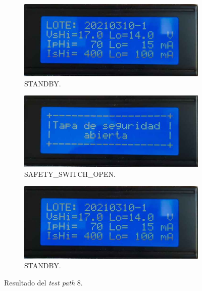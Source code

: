 \begin{figure}[!htpb]
     \centering
     \begin{subfigure}[b]{0.4\textwidth}
         \centering
         \includegraphics[width=1.1\textwidth]{./Figures/pru_fail.jpeg}
         \caption{STANDBY.}
         \label{fig:pruConf_8_1}
     \end{subfigure}
           \hfill
     \begin{subfigure}[b]{0.4\textwidth}
         \centering
         \includegraphics[width=1.1\textwidth]{./Figures/tapa_abierta.jpeg}
         \caption{SAFETY\_SWITCH\_OPEN.}
         \label{fig:pruConf_8_2}
     \end{subfigure}
           \hfill
     \begin{subfigure}[b]{0.4\textwidth}
         \centering
         \includegraphics[width=1.1\textwidth]{./Figures/pru_fail.jpeg}
         \caption{STANDBY.}
         \label{fig:pruConf_8_3}
     \end{subfigure}
        \caption{Resultado del \textit{test path} 8.}
        \label{fig:pruConf_8_res}
\end{figure}

